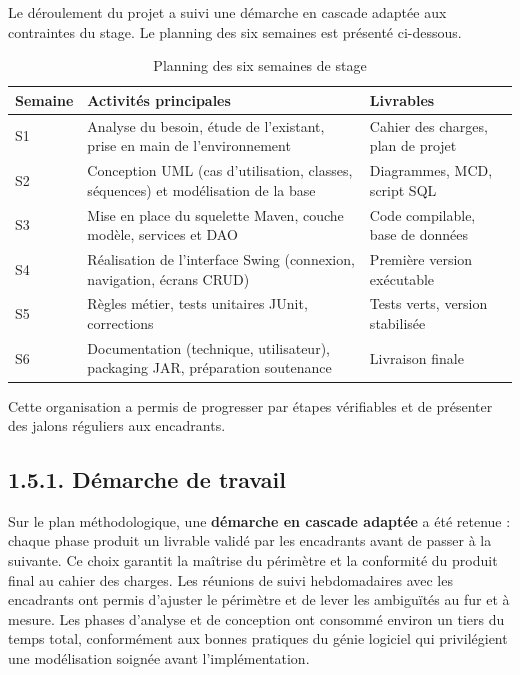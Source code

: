 \documentclass[11pt,a4paper]{report}
\begin{document}
Le déroulement du projet a suivi une démarche en cascade adaptée aux contraintes du stage. Le planning des six semaines est présenté ci-dessous.
\begin{table}[htbp]\centering\small
\begin{tabularx}{\textwidth}{|X|X|X|}
\hline\rowcolor{hdr}\textbf{Semaine} & \textbf{Activités principales} & \textbf{Livrables}\\ \hline
S1 & Analyse du besoin, étude de l'existant, prise en main de l'environnement & Cahier des charges, plan de projet\\ \hline
S2 & Conception UML (cas d'utilisation, classes, séquences) et modélisation de la base & Diagrammes, MCD, script SQL\\ \hline
S3 & Mise en place du squelette Maven, couche modèle, services et DAO & Code compilable, base de données\\ \hline
S4 & Réalisation de l'interface Swing (connexion, navigation, écrans CRUD) & Première version exécutable\\ \hline
S5 & Règles métier, tests unitaires JUnit, corrections & Tests verts, version stabilisée\\ \hline
S6 & Documentation (technique, utilisateur), packaging JAR, préparation soutenance & Livraison finale\\ \hline
\end{tabularx}
\caption{Planning des six semaines de stage}
\end{table}

Cette organisation a permis de progresser par étapes vérifiables et de présenter des jalons réguliers aux encadrants.
\subsection*{1.5.1. Démarche de travail}

Sur le plan méthodologique, une \textbf{démarche en cascade adaptée} a été retenue : chaque phase produit un livrable validé par les encadrants avant de passer à la suivante. Ce choix garantit la maîtrise du périmètre et la conformité du produit final au cahier des charges. Les réunions de suivi hebdomadaires avec les encadrants ont permis d'ajuster le périmètre et de lever les ambiguïtés au fur et à mesure. Les phases d'analyse et de conception ont consommé environ un tiers du temps total, conformément aux bonnes pratiques du génie logiciel qui privilégient une modélisation soignée avant l'implémentation.
\end{document}
